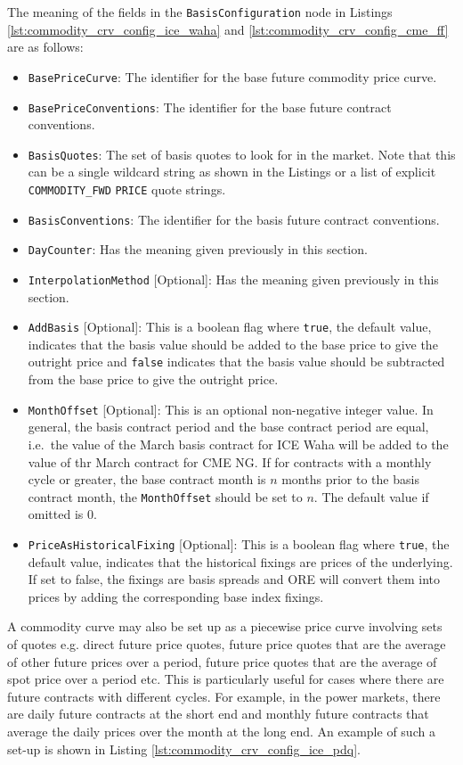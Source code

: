 The meaning of the fields in the \lstinline!BasisConfiguration! node in Listings \ref{lst:commodity_crv_config_ice_waha} and \ref{lst:commodity_crv_config_cme_ff} are as follows:
\begin{itemize}
\item \lstinline!BasePriceCurve!: The identifier for the base future commodity price curve.
\item \lstinline!BasePriceConventions!: The identifier for the base future contract conventions.
\item \lstinline!BasisQuotes!: The set of basis quotes to look for in the market. Note that this can be a single wildcard string as shown in the Listings or a list of explicit \lstinline!COMMODITY_FWD! \lstinline!PRICE! quote strings.
\item \lstinline!BasisConventions!: The identifier for the basis future contract conventions.
\item \lstinline!DayCounter!: Has the meaning given previously in this section.
\item \lstinline!InterpolationMethod! [Optional]: Has the meaning given previously in this section.
\item \lstinline!AddBasis! [Optional]: This is a boolean flag where \lstinline!true!, the default value, indicates that the basis value should be added to the base price to give the outright price and \lstinline!false! indicates that the basis value should be subtracted from the base price to give the outright price.
\item \lstinline!MonthOffset! [Optional]: This is an optional non-negative integer value. In general, the basis contract period and the base contract period are equal, i.e.\ the value of the March basis contract for ICE Waha will be added to the value of thr March contract for CME NG. If for contracts with a monthly cycle or greater, the base contract month is $n$ months prior to the basis contract month, the \lstinline!MonthOffset! should be set to $n$. The default value if omitted is 0.
\item \lstinline!PriceAsHistoricalFixing! [Optional]: This is a boolean flag where \lstinline!true!, the default value, indicates that the historical fixings are prices of the underlying. If set to false, the fixings are basis spreads and ORE will convert them into prices by adding the corresponding base index fixings.

\end{itemize}

A commodity curve may also be set up as a piecewise price curve involving sets of quotes e.g. direct future price quotes, future price quotes that are the average of other future prices over a period, future price quotes that are the average of spot price over a period etc. This is particularly useful for cases where there are future contracts with different cycles. For example, in the power markets, there are daily future contracts at the short end and monthly future contracts that average the daily prices over the month at the long end. An example of such a set-up is shown in Listing \ref{lst:commodity_crv_config_ice_pdq}.

